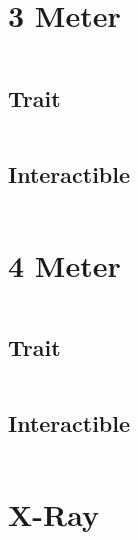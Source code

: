 \documentclass[main.tex]{subfiles}
\begin{document}
\section{3 Meter}


\begin{lstlisting}[language=FG]
\end{lstlisting}

\subsection{Trait}

\begin{lstlisting}[language=FG]
\end{lstlisting}


\subsection{Interactible}
\begin{lstlisting}[language=FG]

\end{lstlisting}
\section{4 Meter}

\begin{lstlisting}[language=FG]
\end{lstlisting}

\subsection{Trait}

\begin{lstlisting}[language=FG]
\end{lstlisting}


\subsection{Interactible}
\begin{lstlisting}[language=FG]

\end{lstlisting}

\section{X-Ray}
\end{document}
